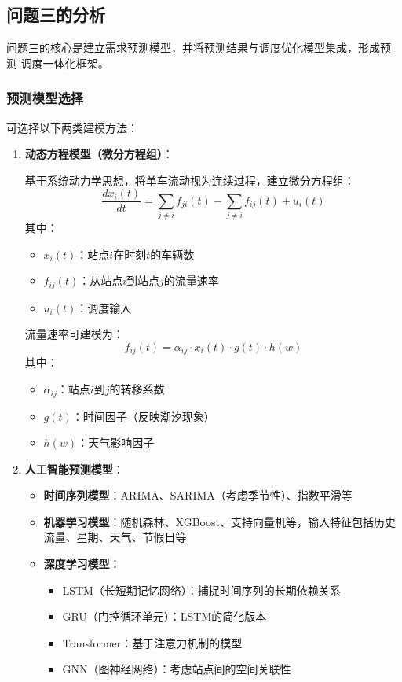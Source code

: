 \documentclass[12pt,a4paper]{ctexart}
\begin{document}
\subsection{问题三的分析}

问题三的核心是建立需求预测模型，并将预测结果与调度优化模型集成，形成预测-调度一体化框架。

\subsubsection{预测模型选择}

可选择以下两类建模方法：

\begin{enumerate}
    \item \textbf{动态方程模型（微分方程组）}：

    基于系统动力学思想，将单车流动视为连续过程，建立微分方程组：
    \begin{equation}
        \frac{dx_i(t)}{dt} = \sum_{j \neq i} f_{ji}(t) - \sum_{j \neq i} f_{ij}(t) + u_i(t)
    \end{equation}
    其中：
    \begin{itemize}
        \item $x_i(t)$：站点$i$在时刻$t$的车辆数
        \item $f_{ij}(t)$：从站点$i$到站点$j$的流量速率
        \item $u_i(t)$：调度输入
    \end{itemize}

    流量速率可建模为：
    \begin{equation}
        f_{ij}(t) = \alpha_{ij} \cdot x_i(t) \cdot g(t) \cdot h(w)
    \end{equation}
    其中：
    \begin{itemize}
        \item $\alpha_{ij}$：站点$i$到$j$的转移系数
        \item $g(t)$：时间因子（反映潮汐现象）
        \item $h(w)$：天气影响因子
    \end{itemize}

    \item \textbf{人工智能预测模型}：

    \begin{itemize}
        \item \textbf{时间序列模型}：ARIMA、SARIMA（考虑季节性）、指数平滑等
        \item \textbf{机器学习模型}：随机森林、XGBoost、支持向量机等，输入特征包括历史流量、星期、天气、节假日等
        \item \textbf{深度学习模型}：
        \begin{itemize}
            \item LSTM（长短期记忆网络）：捕捉时间序列的长期依赖关系
            \item GRU（门控循环单元）：LSTM的简化版本
            \item Transformer：基于注意力机制的模型
            \item GNN（图神经网络）：考虑站点间的空间关联性
        \end{itemize}
    \end{itemize}
\end{enumerate}
\end{document}
